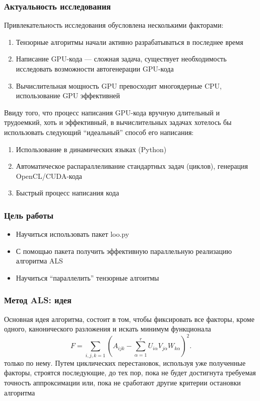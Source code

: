 \documentclass[presentation]{beamer}
\begin{document}
\begin{frame}
\frametitle{Актуальность исследования}
\label{sec-1-10}

Привлекательность исследования обусловлена несколькими факторами:
\begin{enumerate}
\item Тензорные алгоритмы начали активно разрабатываться в последнее время
\item Написание GPU-кода --- сложная задача, существует необходимость исследовать возможности автогенерации GPU-кода
\item Вычислительная мощность GPU превосходит многоядерные CPU, использование GPU эффективней
\end{enumerate}
\end{frame}
\begin{frame}

Ввиду того, что процесс написания GPU-кода вручную длительный и трудоемкий, хоть и эффективный,
 в вычислительных задачах хотелось бы использовать следующий ``идеальный'' способ его написания:
\begin{enumerate}
\item Использование в динамических языках (Python)
\item Автоматическое распараллеливание стандартных задач (циклов), генерация OpenCL/CUDA-кода
\item Быстрый процесс написания кода
\end{enumerate}
\end{frame}
\begin{frame}
\frametitle{Цель работы}
\label{sec-1-12}

\begin{itemize}
\item Научиться использовать пакет loo.py
\item С помощью пакета получить эффективную параллельную реализацию алгоритма ALS
\item Научиться ``параллелить'' тензорные алгоитмы
\end{itemize}
\end{frame}
\begin{frame}
\frametitle{Метод ALS: идея}
\label{sec-1-13}


Основная идея алгоритма, состоит в том, чтобы фиксировать все факторы,
кроме одного, канонического разложения и искать минимум функционала 
\begin{equation*}
F=\sum_{i,j,k=1} (A_{ijk}-\sum_{\alpha=1}^r U_{i\alpha}V_{j\alpha}W_{k\alpha})^2.
\end{equation*}
только по нему.
Путем циклических перестановок, используя уже полученные факторы, строятся последующие, до тех пор,
пока не будет достигнута требуемая точность аппроксимации или, пока не сработают другие критерии
остановки алгоритма
\end{frame}
\end{document}
